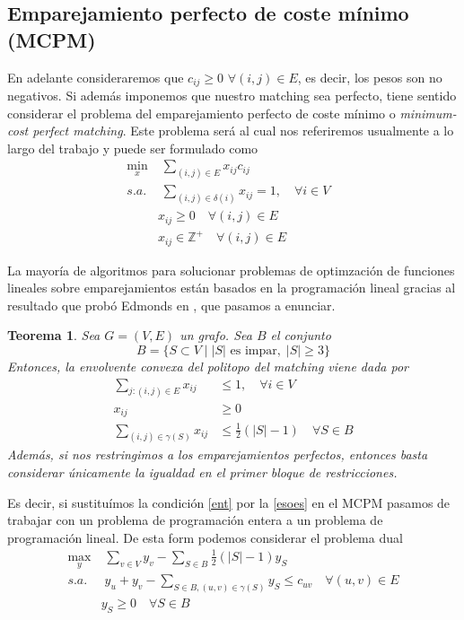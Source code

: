 \documentclass[twoside,a4paper,openright,12pt]{book}
\newtheorem{thm}{Teorema}[section]
\newcommand{\Z}{\mathbb{Z}}
\begin{document}
\subsection{Emparejamiento perfecto de coste mínimo (MCPM)}
En adelante consideraremos que $c_{ij}\geq 0$ $\forall (i,j)\in E$, es decir, los pesos son no negativos. Si además imponemos que nuestro matching sea perfecto, tiene sentido considerar el problema del emparejamiento perfecto de coste mínimo o \textit{minimum-cost perfect matching}. Este problema será al cual nos referiremos usualmente a lo largo del trabajo y puede ser formulado como 
\begin{align}
\min_{x} &\; \sum_{(i,j)\in E} x_{ij}c_{ij} \nonumber&\\ 
s.a.&\; \sum_{(i,j)\in\delta(i)} x_{ij} = 1, \quad \forall i \in V\\
& x_{ij}\geq 0 \quad \forall (i,j) \in E\\
& x_{ij} \in \Z^+  \quad \forall (i,j) \in E \label{ent}
\end{align}

La mayoría de algoritmos para solucionar problemas de optimzación de funciones lineales sobre emparejamientos están basados en la programación lineal gracias al resultado que probó Edmonds en \cite{edmond}, que pasamos a enunciar.
\begin{thm}
Sea $G=(V,E)$ un grafo. Sea $B$ el conjunto
$$
B = \{S\subset V \mid |S| \text{ es impar},\;|S|\geq 3\}
$$
Entonces, la envolvente convexa del politopo del matching viene dada por
\begin{align}
\sum_{j:(i,j)\in E} x_{ij} &\leq 1, \quad \forall i \in V\tag{1.1}\\
x_{ij} &\geq 0\tag{1.2}\\
\sum_{(i,j)\in \gamma(S)} x_{ij}& \leq \frac{1}{2}(|S|-1)\quad \forall S \in B	\tag{1.4} \label{esoes}
\end{align}
Además, si nos restringimos a los emparejamientos perfectos, entonces basta considerar únicamente la igualdad en el primer bloque de restricciones.
\end{thm}
Es decir, si sustituímos la condición \ref{ent} por la \ref{esoes} en el MCPM pasamos de trabajar con un problema de programación entera a un problema de programación lineal. De esta form podemos considerar el problema dual
\begin{align*}
\max_{y} &\; \sum_{v\in V} y_v - \sum_{S\in B} \frac{1}{2}(|S|-1)y_S\\
s.a.&\;y_u+y_v - \sum_{S\in B,(u,v)\in \gamma(S)}y_S  \leq c_{uv} \quad \forall (u,v)\in E\\
&y_S\geq 0 \quad \forall S\in B
\end{align*}
\end{document}
